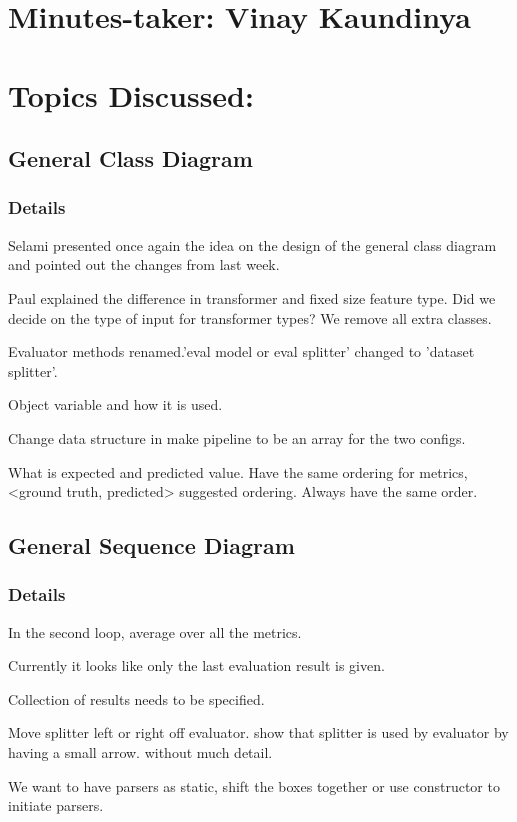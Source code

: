 \documentclass[11pt]{meetingmins} %
\begin{document}
\maketitle

\section{Minutes-taker: Vinay Kaundinya}

\section{Topics Discussed:}

\subsection{General Class Diagram}
\subsubsection{Details}
\begin{hiddensubitems}
    \item Selami presented once again the idea on the design of the general class diagram and pointed
    out the changes from last week.
    \item Paul explained the difference in transformer and fixed size feature type. Did we decide on the type of input for transformer types? We remove all extra classes.
    \item Evaluator methods renamed.'eval model or eval splitter' changed to 'dataset splitter'.
    \item Object variable and how it is used.
    \item Change data structure in make pipeline to be an array for the two configs.
    \item What is expected and predicted value. Have the same ordering for metrics, <ground truth, predicted> suggested ordering. Always have the same order.
\end{hiddensubitems}

\subsection{General Sequence Diagram}
\subsubsection{Details}
\begin{hiddensubitems}
    \item In the second loop, average over all the metrics.
    \item Currently it looks like only the last evaluation result is given.
    \item Collection of results needs to be specified.
    \item Move splitter left or right off evaluator. show that splitter is used by evaluator by having a small arrow. without much detail.
    \item We want to have parsers as static, shift the boxes together or use constructor to initiate parsers.
\end{hiddensubitems}
\end{document}
